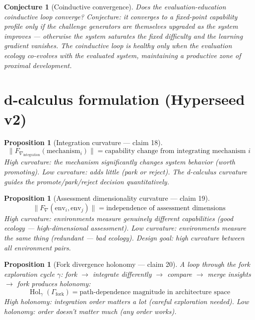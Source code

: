 \documentclass[11pt,a4paper]{article}
\newtheorem{proposition}[definition]{Proposition}
\newtheorem{conjecture}[definition]{Conjecture}
\begin{document}
\begin{conjecture}[Coinductive convergence]
Does the evaluation-education coinductive loop converge? Conjecture:
it converges to a fixed-point capability profile only if the challenge
generators are themselves upgraded as the system improves --- otherwise
the system saturates the fixed difficulty and the learning gradient
vanishes. The coinductive loop is healthy only when the evaluation
ecology co-evolves with the evaluated system, maintaining a productive
zone of proximal development.
\end{conjecture}

\section{d-calculus formulation (Hyperseed v2)}

\begin{proposition}[Integration curvature --- claim 18]
\label{prop:int_curv}
\[
  \|F_{\nabla_{\text{integration}}}(\text{mechanism}_i)\| =
    \text{capability change from integrating mechanism } i
\]
High curvature: the mechanism significantly changes system behavior
(worth promoting). Low curvature: adds little (park or reject). The
d-calculus curvature guides the promote/park/reject decision quantitatively.
\end{proposition}

\begin{proposition}[Assessment dimensionality curvature --- claim 19]
\label{prop:assess_curv}
\[
  \|F_\nabla(\text{env}_i, \text{env}_j)\| = \text{independence of
    assessment dimensions}
\]
High curvature: environments measure genuinely different capabilities
(good ecology --- high-dimensional assessment). Low curvature:
environments measure the same thing (redundant --- bad ecology). Design
goal: high curvature between all environment pairs.
\end{proposition}

\begin{proposition}[Fork divergence holonomy --- claim 20]
\label{prop:fork_hol}
A loop through the fork exploration cycle $\gamma$: fork $\to$ integrate
differently $\to$ compare $\to$ merge insights $\to$ fork produces
holonomy:
\[
  \operatorname{Hol}_\gamma(\Gamma_{\text{fork}}) = \text{path-dependence
    magnitude in architecture space}
\]
High holonomy: integration order matters a lot (careful exploration
needed). Low holonomy: order doesn't matter much (any order works).
\end{proposition}
\end{document}
